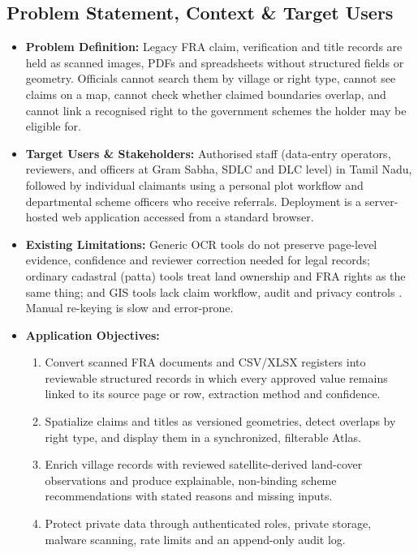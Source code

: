 \documentclass[11pt, a4paper]{article}
\begin{document}
\subsection{Problem Statement, Context \& Target Users}
\begin{itemize}[noitemsep, topsep=2pt]
    \item \textbf{Problem Definition:} Legacy FRA claim, verification and title records are held as scanned images, PDFs and spreadsheets without structured fields or geometry. Officials cannot search them by village or right type, cannot see claims on a map, cannot check whether claimed boundaries overlap, and cannot link a recognised right to the government schemes the holder may be eligible for.
    \item \textbf{Target Users \& Stakeholders:} Authorised staff (data-entry operators, reviewers, and officers at Gram Sabha, SDLC and DLC level) in Tamil Nadu, followed by individual claimants using a personal plot workflow and departmental scheme officers who receive referrals. Deployment is a server-hosted web application accessed from a standard browser.
    \item \textbf{Existing Limitations:} Generic OCR tools do not preserve page-level evidence, confidence and reviewer correction needed for legal records; ordinary cadastral (patta) tools treat land ownership and FRA rights as the same thing; and GIS tools lack claim workflow, audit and privacy controls \cite{fra2006,du2020ppocr}. Manual re-keying is slow and error-prone.
    \item \textbf{Application Objectives:}
    \begin{enumerate}[noitemsep, topsep=2pt]
        \item Convert scanned FRA documents and CSV/XLSX registers into reviewable structured records in which every approved value remains linked to its source page or row, extraction method and confidence.
        \item Spatialize claims and titles as versioned geometries, detect overlaps by right type, and display them in a synchronized, filterable Atlas.
        \item Enrich village records with reviewed satellite-derived land-cover observations and produce explainable, non-binding scheme recommendations with stated reasons and missing inputs.
        \item Protect private data through authenticated roles, private storage, malware scanning, rate limits and an append-only audit log.
    \end{enumerate}
\end{itemize}
\end{document}
